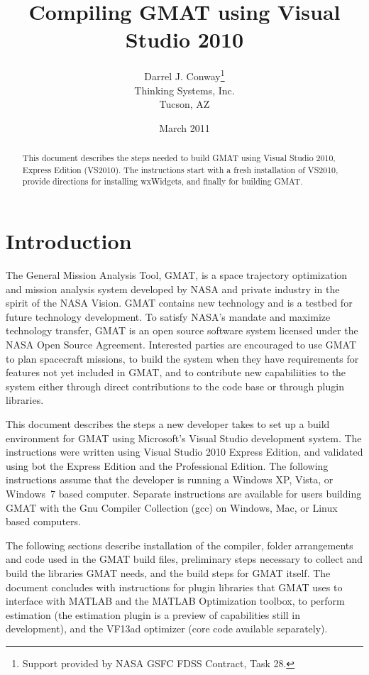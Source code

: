 \documentclass[letterpaper,10pt]{article}%
\begin{document}
\title{Compiling GMAT using Visual Studio 2010}
\author{Darrel J. Conway\thanks{Support provided by NASA GSFC FDSS Contract, Task 28.}
\\Thinking Systems, Inc.\\Tucson, AZ}
\date{March 2011}
\maketitle

\begin{abstract}
This document describes the steps needed to build GMAT using Visual Studio 2010, Express Edition (VS2010).  The instructions start with a fresh installation of VS2010, provide directions for installing wxWidgets, and finally for building GMAT. 
\end{abstract}

\section{Introduction}

The General Mission Analysis Tool, GMAT, is a space trajectory optimization and mission analysis system developed by NASA and private industry in the spirit of the NASA Vision. GMAT contains new technology and is a testbed for future technology development. To satisfy NASA's mandate and maximize technology transfer, GMAT is an open source software system licensed under the NASA Open Source Agreement.  Interested parties are encouraged to use GMAT to plan spacecraft missions, to build the system when they have requirements for features not yet included in GMAT, and to contribute new capabiliities to the system either through direct contributions to the code base or through plugin libraries.

This document describes the steps a new developer takes to set up a build environment for GMAT using Microsoft's Visual Studio development system.  The instructions were written using Visual Studio 2010 Express Edition, and validated using bot the Express Edition and the Professional Edition.  The following instructions assume that the developer is running a Windows XP, Vista, or Windows~7 based computer.  Separate instructions are available for users building GMAT with the Gnu Compiler Collection (gcc) on Windows, Mac, or Linux based computers.

The following sections describe installation of the compiler, folder arrangements and code used in the GMAT build files, preliminary steps necessary to collect and build the libraries GMAT needs, and the build steps for GMAT itself.  The document concludes with instructions for plugin libraries that GMAT uses to interface with MATLAB and the MATLAB Optimization toolbox, to perform estimation (the estimation plugin is a preview of capabilities still in development), and the VF13ad optimizer (core code available separately).
\end{document}

